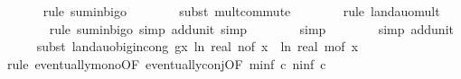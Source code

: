 \begin{isabellebody}
\ \ \ \ \ \isamarkupfalse%
\ {\isacharparenleft}{\kern0pt}rule\ sum{\isacharunderscore}{\kern0pt}in{\isacharunderscore}{\kern0pt}bigo{\isacharparenright}{\kern0pt}\isanewline
\ \ \ \ \ \ \isamarkupfalse%
\ {\isacharparenleft}{\kern0pt}subst\ mult{\isachardot}{\kern0pt}commute{\isacharparenright}{\kern0pt}\isanewline
\ \ \ \ \ \ \isamarkupfalse%
\ {\isacharparenleft}{\kern0pt}rule\ landau{\isacharunderscore}{\kern0pt}o{\isachardot}{\kern0pt}mult{\isacharparenright}{\kern0pt}\isanewline
\ \ \ \ \ \ \isamarkupfalse%
\ {\isacharparenleft}{\kern0pt}rule\ sum{\isacharunderscore}{\kern0pt}in{\isacharunderscore}{\kern0pt}bigo{\isacharcomma}{\kern0pt}\ simp\ add{\isacharcolon}{\kern0pt}unit{\isacharunderscore}{\kern0pt}{}{\isacharcomma}{\kern0pt}\ simp{\isacharparenright}{\kern0pt}\isanewline
\ \ \ \ \ \ \isamarkupfalse%
\ simp\isanewline
\ \ \ \ \ \ \isamarkupfalse%
\ {\isacharparenleft}{\kern0pt}simp\ add{\isacharcolon}{\kern0pt}unit{\isacharunderscore}{\kern0pt}{}{\isacharparenright}{\kern0pt}\isanewline
\ \ \ \ \isamarkupfalse%
\ {\isacharparenleft}{\kern0pt}subst\ landau{\isacharunderscore}{\kern0pt}o{\isachardot}{\kern0pt}big{\isachardot}{\kern0pt}in{\isacharunderscore}{\kern0pt}cong{\isacharbrackleft}{\kern0pt}\ g{\isacharequal}{\kern0pt}{\isachardoublequoteopen}{\isasymlambda}x{\isachardot}{\kern0pt}\ ln\ {\isacharparenleft}{\kern0pt}real\ {\isacharparenleft}{\kern0pt}n{\isacharunderscore}{\kern0pt}of\ x{\isacharparenright}{\kern0pt}{\isacharparenright}{\kern0pt}\ {\isacharplus}{\kern0pt}\ ln\ {\isacharparenleft}{\kern0pt}real\ {\isacharparenleft}{\kern0pt}m{\isacharunderscore}{\kern0pt}of\ x{\isacharparenright}{\kern0pt}{\isacharparenright}{\kern0pt}{\isachardoublequoteclose}{\isacharbrackright}{\kern0pt}{\isacharparenright}{\kern0pt}\isanewline
\ \ \ \ \ \isamarkupfalse%
\ {\isacharparenleft}{\kern0pt}rule\ eventually{\isacharunderscore}{\kern0pt}mono{\isacharbrackleft}{\kern0pt}OF\ eventually{\isacharunderscore}{\kern0pt}conj{\isacharbrackleft}{\kern0pt}OF\ m{\isacharunderscore}{\kern0pt}inf{\isacharbrackleft}{\kern0pt}\ c{\isacharequal}{\kern0pt}{\isachardoublequoteopen}{}{\isachardoublequoteclose}{\isacharbrackright}{\kern0pt}\ n{\isacharunderscore}{\kern0pt}inf{\isacharbrackleft}{\kern0pt}\ c{\isacharequal}{\kern0pt}{\isachardoublequoteopen}{}{\isachardoublequoteclose}{\isacharbrackright}{\kern0pt}{\isacharbrackright}{\kern0pt}{\isacharbrackright}{\kern0pt}{\isacharparenright}{\kern0pt}\isanewline

\end{isabellebody}
